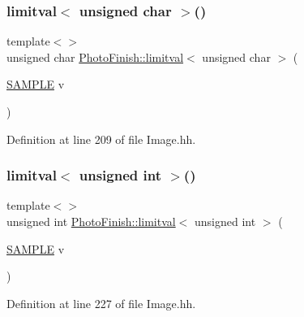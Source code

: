 \mbox{\label{namespace_photo_finish_ac8676e30ad327c0a4efd5a88b25cb4a0}} 
\subsubsection{\texorpdfstring{limitval$<$ unsigned char $>$()}{limitval< unsigned char >()}}
{\footnotesize\ttfamily template$<$$>$ \\
unsigned char \hyperlink{namespace_photo_finish_aa019419c2456e119283e24d6e6fa3cbb}{Photo\+Finish\+::limitval}$<$ unsigned char $>$ (\begin{DoxyParamCaption}\item[{\hyperlink{sample_8h_afc597c76b4f04a2da506a240d51d89a0}{S\+A\+M\+P\+LE}}]{v }\end{DoxyParamCaption})\hspace{0.3cm}{\ttfamily [inline]}}



Definition at line 209 of file Image.\+hh.

\mbox{\label{namespace_photo_finish_a0b7985a8f707df80ad005bccda7ddff3}} 
\subsubsection{\texorpdfstring{limitval$<$ unsigned int $>$()}{limitval< unsigned int >()}}
{\footnotesize\ttfamily template$<$$>$ \\
unsigned int \hyperlink{namespace_photo_finish_aa019419c2456e119283e24d6e6fa3cbb}{Photo\+Finish\+::limitval}$<$ unsigned int $>$ (\begin{DoxyParamCaption}\item[{\hyperlink{sample_8h_afc597c76b4f04a2da506a240d51d89a0}{S\+A\+M\+P\+LE}}]{v }\end{DoxyParamCaption})\hspace{0.3cm}{\ttfamily [inline]}}



Definition at line 227 of file Image.\+hh.

